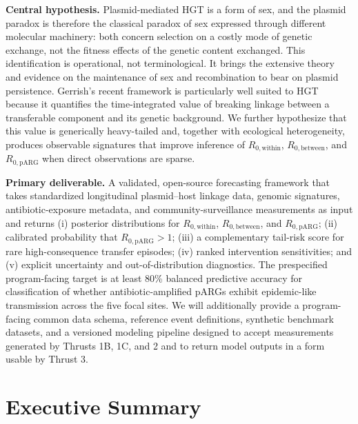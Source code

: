 \documentclass[12pt,a4paper]{article}
\newcommand{\Rwithin}{R_{0,\mathrm{within}}}
\newcommand{\Rbetween}{R_{0,\mathrm{between}}}
\newcommand{\RpARG}{R_{0,\mathrm{pARG}}}
\begin{document}
\textbf{Central hypothesis.} Plasmid-mediated HGT is a form of sex, and the plasmid paradox is therefore the classical paradox of sex expressed through different molecular machinery: both concern selection on a costly mode of genetic exchange, not the fitness effects of the genetic content exchanged. This identification is operational, not terminological. It brings the extensive theory and evidence on the maintenance of sex and recombination to bear on plasmid persistence. Gerrish's recent framework is particularly well suited to HGT because it quantifies the time-integrated value of breaking linkage between a transferable component and its genetic background. We further hypothesize that this value is generically heavy-tailed and, together with ecological heterogeneity, produces observable signatures that improve inference of $\Rwithin$, $\Rbetween$, and $\RpARG$ when direct observations are sparse.

\textbf{Primary deliverable.} A validated, open-source forecasting framework that takes standardized longitudinal plasmid--host linkage data, genomic signatures, antibiotic-exposure metadata, and community-surveillance measurements as input and returns (i) posterior distributions for $\Rwithin$, $\Rbetween$, and $\RpARG$; (ii) calibrated probability that $\RpARG>1$; (iii) a complementary tail-risk score for rare high-consequence transfer episodes; (iv) ranked intervention sensitivities; and (v) explicit uncertainty and out-of-distribution diagnostics. The prespecified program-facing target is at least 80\% balanced predictive accuracy for classification of whether antibiotic-amplified pARGs exhibit epidemic-like transmission across the five focal sites. We will additionally provide a program-facing common data schema, reference event definitions, synthetic benchmark datasets, and a versioned modeling pipeline designed to accept measurements generated by Thrusts 1B, 1C, and 2 and to return model outputs in a form usable by Thrust 3.

\newpage

\section*{Executive Summary}
\end{document}
